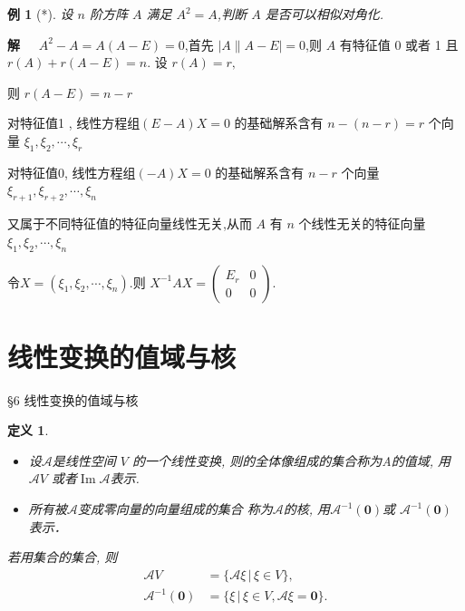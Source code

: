\documentclass[13pt]{beamer}
\newtheorem{exa}{例}
\newtheorem*{defi}{定义}
\def\sol{{\bf 解~~ }}
\def\A{\mathscr{A}}
\def\0{\mathbf{0}}
\begin{document}
\begin{frame}
\begin{exa}[*]
	设 $n$ 阶方阵 $A$ 满足 $A^{2}=A$,判断 $A$ 是否可以相似对角化.
\end{exa}
\sol
	$A^{2}-A=A(A-E)=0$,首先 $|A \| A-E|=0$,则 $A$ 有特征值 0 或者 1
	且 $r(A)+r(A-E)=n .$ 设 $r(A)=r,$ 
	
	则 $r(A-E)=n-r$
	
	对特征值1 , 线性方程组$(E-A) X=0$ 的基础解系含有 $n-(n-r)=r$ 个向量 $\xi_{1}, \xi_{2}, \cdots, \xi_{r}$
	
	对特征值0, 线性方程组$(-A) X=0$ 的基础解系含有 $n-r$ 个向量 $\xi_{r+1}, \xi_{r+2}, \cdots, \xi_{n}$
	
	又属于不同特征值的特征向量线性无关,从而 $A$ 有 $n$ 个线性无关的特征向量 $\xi_{1}, \xi_{2}, \cdots, \xi_{n}$
	
	令$X=\left(\xi_{1}, \xi_{2}, \cdots, \xi_{n}\right)$.则 $X^{-1} A X=\left(\begin{array}{cc}E_{r} & 0 \\ 0 & 0\end{array}\right)$.
\end{frame}






\section{线性变换的值域与核}
\begin{frame}{\S 6 线性变换的值域与核}
\begin{defi}
\begin{itemize}
	\item 设$\A$是线性空间 $V$ 的一个线性变换,
	则的全体像组成的集合称为A的\alert{值域},
	用$\A V$ 或者$\operatorname{Im} \A$表示.
	\item 
	所有被$\A$变成零向量的向量组成的集合
	称为$\A$的\alert{核}, 用$\A^{-1}(\0)$或 $\A ^{-1}(\0)$表示．
\end{itemize}


若用集合的集合, 则
\begin{align*}
\A V  & = \{ \A\xi \,| \, \xi \in V \},\\
\A^{-1}(\0) & = \{\xi \, | \,\xi \in V,  \A \xi = \0\}.
\end{align*}

\end{defi}

\end{frame}
\end{document}
